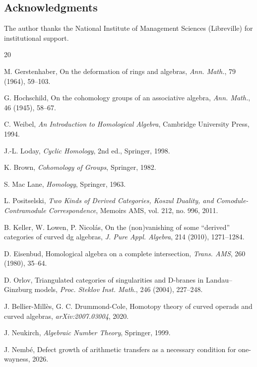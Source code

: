 \documentclass[11pt,a4paper]{article}
\theoremstyle{plain}
\theoremstyle{definition}
\theoremstyle{remark}
\begin{document}
\subsection*{Acknowledgments}

The author thanks the National Institute of Management Sciences 
(Libreville) for institutional support.

\begin{thebibliography}{20}

 M. Gerstenhaber, On the deformation of 
rings and algebras, \textit{Ann. Math.}, 79 (1964), 59--103.

 G. Hochschild, On the cohomology groups of 
an associative algebra, \textit{Ann. Math.}, 46 (1945), 58--67.

 C. Weibel, \textit{An Introduction to 
Homological Algebra}, Cambridge University Press, 1994.

 J.-L. Loday, \textit{Cyclic Homology}, 2nd ed., 
Springer, 1998.

 K. Brown, \textit{Cohomology of Groups}, 
Springer, 1982.

 S. Mac Lane, \textit{Homology}, Springer, 1963.

 L. Positselski, \textit{Two Kinds of 
Derived Categories, Koszul Duality, and Comodule-Contramodule 
Correspondence}, Memoirs AMS, vol. 212, no. 996, 2011.

 B. Keller, W. Lowen, P. Nicol\'as, 
On the (non)vanishing of some ``derived'' categories of curved dg 
algebras, \textit{J. Pure Appl. Algebra}, 214 (2010), 1271--1284.

 D. Eisenbud, Homological algebra on a complete 
intersection, \textit{Trans. AMS}, 260 (1980), 35--64.

 D. Orlov, Triangulated categories of 
singularities and D-branes in Landau--Ginzburg models, \textit{Proc. 
Steklov Inst. Math.}, 246 (2004), 227--248.

 J. Bellier-Mill\`es, G. C. 
Drummond-Cole, Homotopy theory of curved operads and curved algebras, 
\textit{arXiv:2007.03004}, 2020.

 J. Neukirch, \textit{Algebraic Number Theory}, 
Springer, 1999.

 J. Nemb\'e, Defect growth of arithmetic 
transfers as a necessary condition for one-wayness, 2026.

\end{thebibliography}
\end{document}
